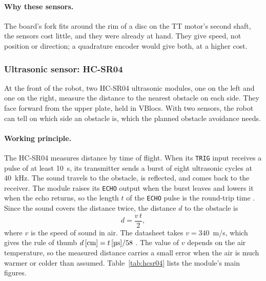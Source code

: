 \paragraph{Why these sensors.} The board's fork fits around the rim of a disc on the TT
motor's second shaft, the sensors cost little, and they were already at hand. They give
speed, not position or direction; a quadrature encoder would give both, at a higher cost.

\subsubsection{Ultrasonic sensor: HC-SR04}
\label{sec:hcsr04}
At the front of the robot, two HC-SR04 ultrasonic modules, one on the left and one on the
right, measure the distance to the nearest obstacle on each side. They face forward from
the upper plate, held in VBlocs.  With two sensors, the robot can tell on which side an obstacle is, which the
planned obstacle avoidance needs.

\paragraph{Working principle.} The HC-SR04 measures distance by time of flight. When its
\texttt{TRIG} input receives a pulse of at least 10~\textmu s, its transmitter sends a
burst of eight ultrasonic cycles at 40~kHz. The sound travels to the obstacle, is
reflected, and comes back to the receiver. The module raises its \texttt{ECHO} output
when the burst leaves and lowers it when the echo returns, so the length \(t\) of the
\texttt{ECHO} pulse is the round-trip time \cite{hcsr04_datasheet}. Since the sound
covers the distance twice, the distance \(d\) to the obstacle is
\begin{equation}
  d = \frac{v \, t}{2},
  \label{eq:tof}
\end{equation}
where \(v\) is the speed of sound in air. The datasheet takes \(v = 340\)~m/s, which
gives the rule of thumb \(d\,[\text{cm}] = t\,[\text{\textmu s}] / 58\)
\cite{hcsr04_datasheet}. The value of \(v\) depends on the air temperature, so the
measured distance carries a small error when the air is much warmer or colder than
assumed. Table~\ref{tab:hcsr04} lists the module's main figures.

